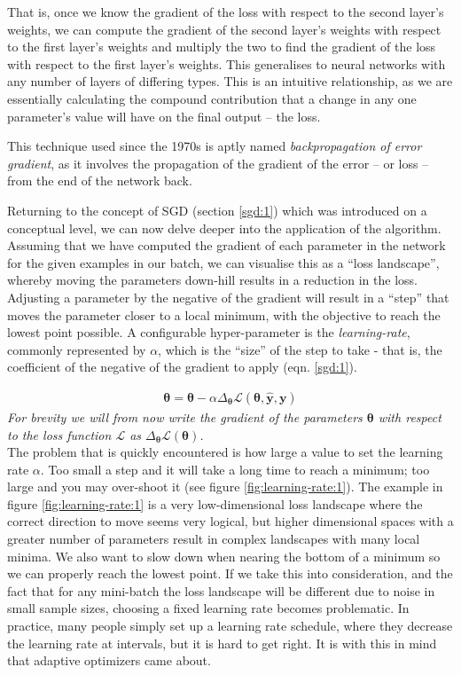 \documentclass{report}
\begin{document}
	That is, once we know the gradient of the loss with respect to the second layer's weights, we can compute the gradient of the second layer's weights with respect to the first layer's weights and multiply the two to find the gradient of the loss with respect to the first layer's weights. This generalises to neural networks with any number of layers of differing types. This is an intuitive relationship, as we are essentially calculating the compound contribution that a change in any one parameter's value will have on the final output -- the loss.  \par
	This technique used since the 1970s \parencite{backprop} is aptly named \textit{backpropagation of error gradient}, as it involves the propagation of the gradient of the error -- or loss -- from the end of the network back. \par
	Returning to the concept of SGD (section \ref{sgd:1}) which was introduced on a conceptual level, we can now delve deeper into the application of the algorithm. Assuming that we have computed the gradient of each parameter in the network for the given examples in our batch, we can visualise this as a ``loss landscape'', whereby moving the parameters down-hill results in a reduction in the loss. Adjusting a parameter by the negative of the gradient will result in a ``step'' that moves the parameter closer to a local minimum, with the objective to reach the lowest point possible. A configurable hyper-parameter is the \textit{learning-rate}, commonly represented by $\alpha$, which is the ``size'' of the step to take - that is, the coefficient of the negative of the gradient to apply (eqn. \ref{sgd:1}). \par
	\begin{align} \label{sgd:1}
		\bm{\theta} = \bm{\theta} - \alpha \Delta_{\bm{\theta}} \mathcal{L}(\bm{\theta}, \bm{\hat{y}}, \bm{y})
	\end{align}
	\textit{For brevity we will from now write the gradient of the parameters $\bm{\theta}$ with respect to the loss function $\mathcal{L}$ as $\Delta_{\bm{\theta}} \mathcal{L}(\bm{\theta})$.} \\
	The problem that is quickly encountered is how large a value to set the learning rate $\alpha$. Too small a step and it will take a long time to reach a minimum; too large and you may over-shoot it (see figure \ref{fig:learning-rate:1}). The example in figure \ref{fig:learning-rate:1} is a very low-dimensional loss landscape where the correct direction to move seems very logical, but higher dimensional spaces with a greater number of parameters result in complex landscapes with many local minima. We also want to slow down when nearing the bottom of a minimum so we can properly reach the lowest point. If we take this into consideration, and the fact that for any mini-batch the loss landscape will be different due to noise in small sample sizes, choosing a fixed learning rate becomes problematic. In practice, many people simply set up a learning rate schedule, where they decrease the learning rate at intervals, but it is hard to get right. It is with this in mind that adaptive optimizers came about. \par
\end{document}
